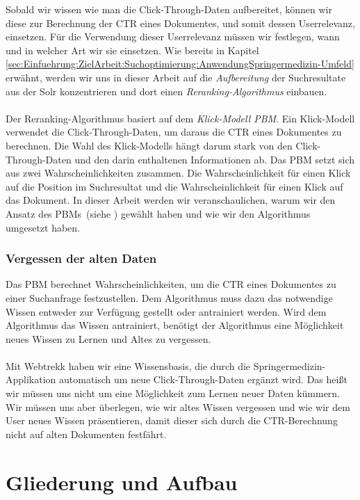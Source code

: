 Sobald wir wissen wie man die Click-Through-Daten aufbereitet, können wir diese zur Berechnung der CTR eines Dokumentes, und somit dessen Userrelevanz, einsetzen. Für die Verwendung dieser Userrelevanz müssen wir festlegen, wann und in welcher Art wir sie einsetzen. Wie bereits in Kapitel \ref{sec:Einfuehrung:ZielArbeit:Suchoptimierung:AnwendungSpringermedizin-Umfeld} erwähnt, werden wir uns in dieser Arbeit auf die \textit{Aufbereitung} der Suchresultate aus der Solr konzentrieren und dort einen \textit{Reranking-Algorithmus} einbauen. 
\\
\\
Der Reranking-Algorithmus basiert auf dem \textit{Klick-Modell PBM}. Ein Klick-Modell verwendet die Click-Through-Daten, um daraus die CTR eines Dokumentes zu berechnen. Die Wahl des Klick-Modells hängt darum stark von den Click-Through-Daten und den darin enthaltenen Informationen ab. Das PBM setzt sich aus zwei Wahrscheinlichkeiten zusammen. Die Wahrscheinlichkeit für einen Klick auf die Position im Suchresultat und die Wahrscheinlichkeit für einen Klick auf das Dokument. In dieser Arbeit werden wir veranschaulichen, warum wir den Ansatz des PBMs~(siehe \cite{pbm}) gewählt haben und wie wir den Algorithmus umgesetzt haben.

\subsubsection{Vergessen der alten Daten}
\label{sec:Einfuehrung:Vergessen}

Das PBM berechnet Wahrscheinlichkeiten, um die CTR eines Dokumentes zu einer Suchanfrage festzustellen. Dem Algorithmus muss dazu das notwendige Wissen entweder zur Verfügung gestellt oder antrainiert werden. Wird dem Algorithmus das Wissen antrainiert, benötigt der Algorithmus eine Möglichkeit neues Wissen zu Lernen und Altes zu vergessen. 
\\
\\
Mit Webtrekk haben wir eine Wissensbasis, die durch die Springermedizin-Applikation automatisch um neue Click-Through-Daten ergänzt wird. Das heißt wir müssen uns nicht um eine Möglichkeit zum Lernen neuer Daten kümmern. Wir müssen uns aber überlegen, wie wir altes Wissen vergessen und wie wir dem User neues Wissen präsentieren, damit dieser sich durch die CTR-Berechnung nicht auf alten Dokumenten festfährt.


\section{Gliederung und Aufbau}
\label{sec:Einfuehrung:GliederungAufbau}

